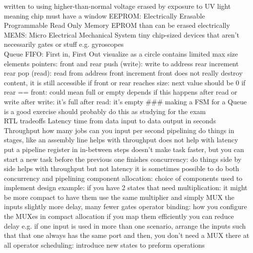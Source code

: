 \documentclass{article}
\begin{document}
\begin{multicols*}{2}
\begin{outline}[compactitem]
\2         written to using higher-than-normal voltage
\2         erased by exposure to UV light
\3             meaning chip must have a window
\1     EEPROM: Electrically Erasable Programmable Read Only Memory
\2         EPROM than can be erased electrically
\noindent \\ 
\0 MEMS: Micro Electrical Mechanical System
\1     tiny chip-sized devices that aren't necessarily gates or stuff
\1     e.g. gyroscopes
\noindent \\ 
\0 Queue
\1     FIFO: First in, First Out
\1     visualize as a circle
\1     contains limited max size elements
 pointers: front and rear
\1     push (write):
\2         write to address rear
\2         increment rear
\1     pop (read):
\2         read from address front
\2         increment front
\2         does not really destroy content, it is still accessible
\1     if front or rear reaches size:
\2         next value should be 0
\1     if rear == front:
\2         could mean full or empty
\2         depends if this happens after read or write
\2         after write: it's full
\2         after read: it's empty
\0 \#\#\# making a FSM for a Queue is a good exercise
\1     should probably do this as studying for the exam
\noindent \\ 
\0 RTL tradeoffs
\1     Latency
\2         time from data input to data output in seconds
\1     Throughput
\2         how many jobs can you input per second
\1     pipelining
\2         do things in stages, like an assembly line
\2         helps with throughput
\2         does not help with latency
\2         put a pipeline register in in-between steps
\2         doesn't make task faster, but you can start a new task before the previous one finishes
\1     concurrency:
\2         do things side by side
\2         helps with throughput but not latency
\1     it is sometimes possible to do both concurrency and pipelining
\1     component allocation:
\2         choice of components used to implement design
\2         example: if you have 2 states that need multiplication:
\3             it might be more compact to have them use the same multiplier and simply MUX the inputs
\3             slightly more delay, many fewer gates
\1     operator binding:
\2         how you configure the MUXes in compact allocation
\2         if you map them efficiently you can reduce delay
\2         e.g. if one input is used in more than one scenario, arrange the inputs such that that one always has the same port
\3             and then, you don't need a MUX there at all
\1     operator scheduling:
\2         introduce new states to preform operations

\end{outline}
\end{multicols*}
\end{document}
